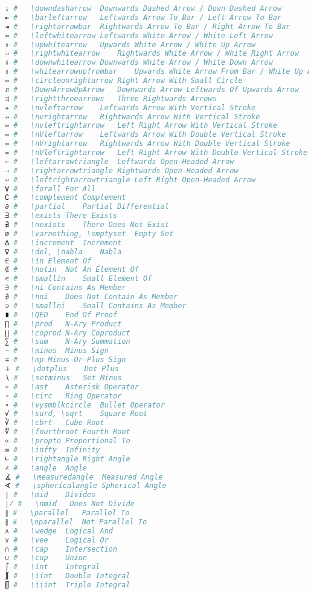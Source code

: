 \begin{lstlisting}[language=Julia, linewidth=\textwidth]
⇣ #   \downdasharrow  Downwards Dashed Arrow / Down Dashed Arrow
⇤ #   \barleftarrow   Leftwards Arrow To Bar / Left Arrow To Bar
⇥ #   \rightarrowbar  Rightwards Arrow To Bar / Right Arrow To Bar
⇦ #   \leftwhitearrow Leftwards White Arrow / White Left Arrow
⇧ #   \upwhitearrow   Upwards White Arrow / White Up Arrow
⇨ #   \rightwhitearrow    Rightwards White Arrow / White Right Arrow
⇩ #   \downwhitearrow Downwards White Arrow / White Down Arrow
⇪ #   \whitearrowupfrombar    Upwards White Arrow From Bar / White Up Arrow From Bar
⇴ #   \circleonrightarrow Right Arrow With Small Circle
⇵ #   \DownArrowUpArrow   Downwards Arrow Leftwards Of Upwards Arrow
⇶ #   \rightthreearrows   Three Rightwards Arrows
⇷ #   \nvleftarrow    Leftwards Arrow With Vertical Stroke
⇸ #   \nvrightarrow   Rightwards Arrow With Vertical Stroke
⇹ #   \nvleftrightarrow   Left Right Arrow With Vertical Stroke
⇺ #   \nVleftarrow    Leftwards Arrow With Double Vertical Stroke
⇻ #   \nVrightarrow   Rightwards Arrow With Double Vertical Stroke
⇼ #   \nVleftrightarrow   Left Right Arrow With Double Vertical Stroke
⇽ #   \leftarrowtriangle  Leftwards Open-Headed Arrow
⇾ #   \rightarrowtriangle Rightwards Open-Headed Arrow
⇿ #   \leftrightarrowtriangle Left Right Open-Headed Arrow
∀ #   \forall For All
∁ #   \complement Complement
∂ #   \partial    Partial Differential
∃ #   \exists There Exists
∄ #   \nexists    There Does Not Exist
∅ #   \varnothing, \emptyset  Empty Set
∆ #   \increment  Increment
∇ #   \del, \nabla    Nabla
∈ #   \in Element Of
∉ #   \notin  Not An Element Of
∊ #   \smallin    Small Element Of
∋ #   \ni Contains As Member
∌ #   \nni    Does Not Contain As Member
∍ #   \smallni    Small Contains As Member
∎ #   \QED    End Of Proof
∏ #   \prod   N-Ary Product
∐ #   \coprod N-Ary Coproduct
∑ #   \sum    N-Ary Summation
− #   \minus  Minus Sign
∓ #   \mp Minus-Or-Plus Sign
∔ #   \dotplus    Dot Plus
∖ #   \setminus   Set Minus
∗ #   \ast    Asterisk Operator
∘ #   \circ   Ring Operator
∙ #   \vysmblkcircle  Bullet Operator
√ #   \surd, \sqrt    Square Root
∛ #   \cbrt   Cube Root
∜ #   \fourthroot Fourth Root
∝ #   \propto Proportional To
∞ #   \infty  Infinity
∟ #   \rightangle Right Angle
∠ #   \angle  Angle
∡ #   \measuredangle  Measured Angle
∢ #   \sphericalangle Spherical Angle
∣ #   \mid    Divides
∤ #   \nmid   Does Not Divide
∥ #   \parallel   Parallel To
∦ #   \nparallel  Not Parallel To
∧ #   \wedge  Logical And
∨ #   \vee    Logical Or
∩ #   \cap    Intersection
∪ #   \cup    Union
∫ #   \int    Integral
∬ #   \iint   Double Integral
∭ #   \iiint  Triple Integral

\end{lstlisting}
